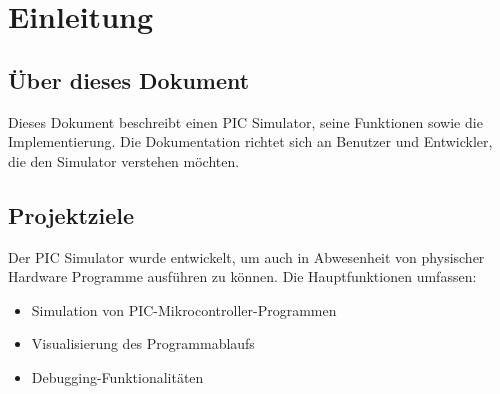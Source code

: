\chapter{Einleitung}

\section{Über dieses Dokument}
Dieses Dokument beschreibt einen PIC Simulator, seine Funktionen sowie die Implementierung. Die Dokumentation richtet sich an Benutzer und Entwickler, die den Simulator verstehen möchten.

\section{Projektziele}
Der PIC Simulator wurde entwickelt, um auch in Abwesenheit von physischer Hardware Programme ausführen zu können. Die Hauptfunktionen umfassen:

\begin{itemize}
    \item Simulation von PIC-Mikrocontroller-Programmen
    \item Visualisierung des Programmablaufs
    \item Debugging-Funktionalitäten
\end{itemize}
